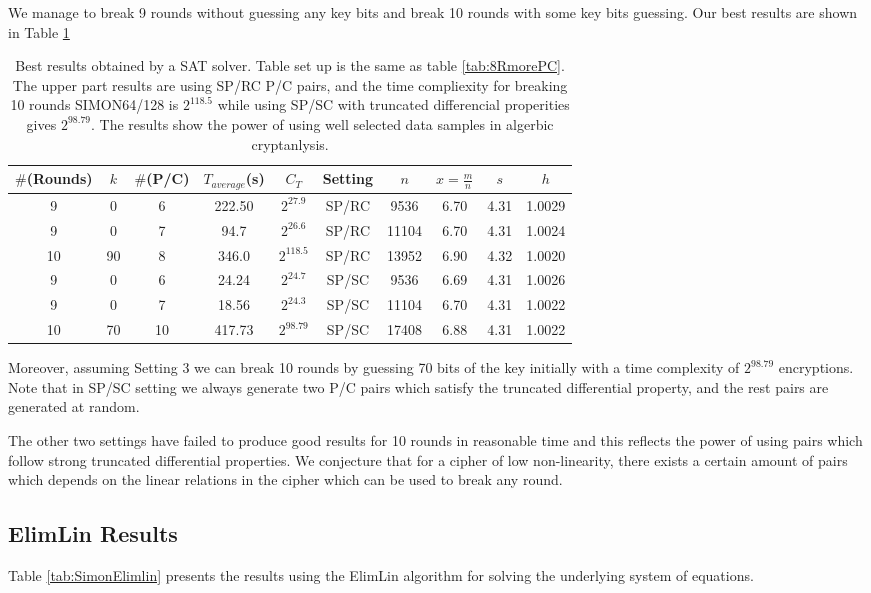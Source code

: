 We manage to break 9 rounds without guessing any key bits and break 10 rounds with some key bits guessing. Our best results are shown in Table \ref{tab:10RmorePC}

\begin{table}[!hh]
	\caption[Best results obtained by a SAT solver]{Best results obtained by a SAT solver. Table set up is the same as table \ref{tab:8RmorePC}. The upper part results are using SP/RC P/C pairs, and the time compliexity for breaking 10 rounds SIMON64/128 is $2^{118.5}$ while using SP/SC with truncated differencial properities gives $2^{98.79}$. The results show the power of using well selected data samples in algerbic cryptanlysis. }\label{tab:10RmorePC} \centering
	\begin{tabular}{|c|c|c|c|c|c|c|c|c|c|}
		\hline
		$\#$(Rounds) & $k$ & $\#$(P/C) & $T_{average}$(s) & $C_T$ & Setting & $n$ & $x=\frac{m}{n}$ & $s$ & $h$ \\
		\hline
		9 & 0 & 6 & 222.50   & $2^{27.9}$ & SP/RC & 9536	& 6.70	& 4.31	& 1.0029 \\
		9 & 0 & 7 & 94.7   & $2^{26.6}$ & SP/RC & 11104	& 6.70	& 4.31	& 1.0024 \\
		10 & 90 & 8 & 346.0   & $2^{118.5}$ & SP/RC & 13952	& 6.90	& 4.32	& 1.0020 \\
		\hline
		9 & 0  & 6 & 24.24   & $2^{24.7}$ & SP/SC  & 9536	& 6.69	& 4.31	& 1.0026  \\
		9 & 0  & 7 & 18.56   & $2^{24.3}$ & SP/SC  & 11104	& 6.70	& 4.31	& 1.0022  \\
		10 & 70  & 10 & 417.73   & $2^{98.79}$ & SP/SC  & 17408	& 6.88	& 4.31	& 1.0022  \\
		\hline
	\end{tabular}
\end{table}

Moreover, assuming Setting 3 we can break 10 rounds by
guessing 70 bits of the key initially with a time complexity of $2^{98.79}$ encryptions.
Note that in SP/SC setting we always generate two P/C pairs which satisfy the truncated differential property, and the rest pairs are generated at random.

The other two settings have failed to produce good results for 10 rounds in reasonable time
and this reflects the power of using pairs which follow strong truncated differential properties. We conjecture that for a cipher of low non-linearity, there exists a certain amount of pairs which depends on the linear relations in the cipher which can be used to break any round.
\subsection{ElimLin Results}
Table \ref{tab:SimonElimlin} presents the results using the ElimLin algorithm for solving the
underlying system of equations.


